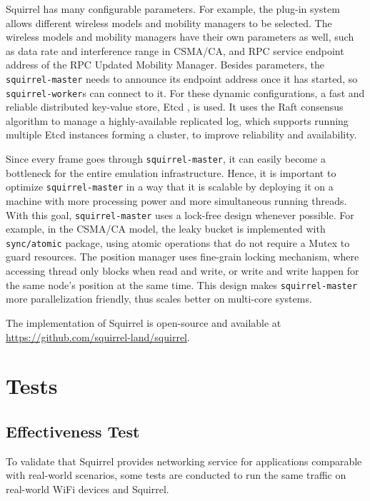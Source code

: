 \documentclass[12pt]{report}
\begin{document}
Squirrel has many configurable parameters. For example, the plug-in system allows different wireless models and mobility managers to be selected. The wireless models and mobility managers have their own parameters as well, such as data rate and interference range in CSMA/CA, and RPC service endpoint address of the RPC Updated Mobility Manager. Besides parameters, the \texttt{squirrel-master} needs to announce its endpoint address once it has started, so \texttt{squirrel-worker}s can connect to it. For these dynamic configurations, a fast and reliable distributed key-value store, Etcd \cite{etcd}, is used. It uses the Raft consensus algorithm \cite{ongaro2014search} to manage a highly-available replicated log, which supports running multiple Etcd instances forming a cluster, to improve reliability and availability.

Since every frame goes through \texttt{squirrel-master}, it can easily become a bottleneck for the entire emulation infrastructure. Hence, it is important to optimize \texttt{squirrel-master} in a way that it is scalable by deploying it on a machine with more processing power and more simultaneous running threads. With this goal, \texttt{squirrel-master} uses a lock-free design whenever possible. For example, in the CSMA/CA model, the leaky bucket is implemented with \texttt{sync/atomic} package, using atomic operations that do not require a Mutex to guard resources. The position manager uses fine-grain locking mechanism, where accessing thread only blocks when read and write, or write and write happen for the same node's position at the same time. This design makes \texttt{squirrel-master} more parallelization friendly, thus scales better on multi-core systems.

The implementation of Squirrel is open-source and available at \url{https://github.com/squirrel-land/squirrel}.

\section{Tests}

\subsection{Effectiveness Test}

To validate that Squirrel provides networking service for applications comparable with real-world scenarios, some tests are conducted to run the same traffic on real-world WiFi devices and Squirrel.
\end{document}
